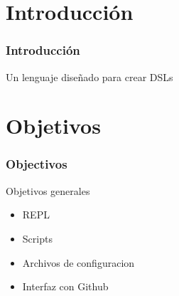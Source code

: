 \section{Introducción}
\begin{frame}
  \frametitle{Introducción}
  \begin{center}
    Un lenguaje diseñado para crear DSLs
  \end{center}
\end{frame}
\section{Objetivos}
\begin{frame}
  \frametitle{Objectivos}
  \begin{center}
    Objetivos generales

    \begin{itemize}
      \item REPL
      \item Scripts
      \item Archivos de configuracion
      \item Interfaz con Github
    \end{itemize}
  \end{center}

  \framebreak{}

\end{frame}
